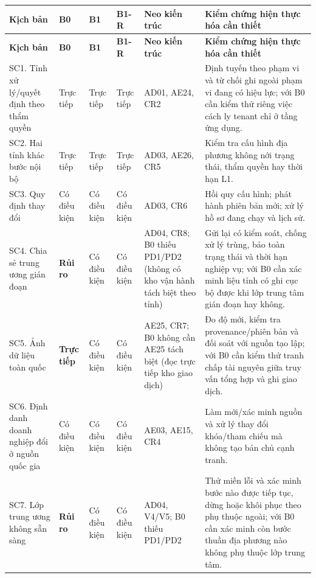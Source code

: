 \documentclass[a4paper,11pt]{article}
\begin{document}
\small
\setlength{\tabcolsep}{2.0pt}
\renewcommand{\arraystretch}{1.02}
\begin{longtable}{@{}p{2.55cm}p{1.35cm}p{1.35cm}p{1.35cm}p{2.95cm}p{4.5cm}@{}}
\toprule
\textbf{Kịch bản} & \textbf{B0} & \textbf{B1} & \textbf{B1-R} & \textbf{Neo kiến trúc} & \textbf{Kiểm chứng hiện thực hóa cần thiết} \\
\midrule
\endfirsthead
\toprule
\textbf{Kịch bản} & \textbf{B0} & \textbf{B1} & \textbf{B1-R} & \textbf{Neo kiến trúc} & \textbf{Kiểm chứng hiện thực hóa cần thiết} \\
\midrule
\endhead
\bottomrule
\endfoot
SC1. Tỉnh xử lý/quyết định theo thẩm quyền & Trực tiếp & Trực tiếp & Trực tiếp & AD01, AE24, CR2 & Định tuyến theo phạm vi và từ chối ghi ngoài phạm vi đang có hiệu lực; với B0 cần kiểm thử riêng việc cách ly tenant chỉ ở tầng ứng dụng. \\
SC2. Hai tỉnh khác bước nội bộ & Trực tiếp & Trực tiếp & Trực tiếp & AD03, AE26, CR5 & Kiểm tra cấu hình địa phương không nới trạng thái, thẩm quyền hay thời hạn L1. \\
SC3. Quy định thay đổi & Có điều kiện & Có điều kiện & Có điều kiện & AD03, CR6 & Hồi quy cấu hình; phát hành phiên bản mới; xử lý hồ sơ đang chạy và lịch sử. \\
SC4. Chia sẻ trung ương gián đoạn & \textbf{Rủi ro} & Có điều kiện & Có điều kiện & AD04, CR8; B0 thiếu PD1/PD2 (không có kho vận hành tách biệt theo tỉnh) & Gửi lại có kiểm soát, chống xử lý trùng, bảo toàn trạng thái và thời hạn nghiệp vụ; với B0 cần xác minh liệu tỉnh có ghi cục bộ được khi lớp trung tâm gián đoạn hay không. \\
SC5. Ảnh dữ liệu toàn quốc & \textbf{Trực tiếp} & Có điều kiện & Có điều kiện & AE25, CR7; B0 không cần AE25 tách biệt (đọc trực tiếp kho giao dịch) & Đo độ mới, kiểm tra provenance/phiên bản và đối soát với nguồn tạo lập; với B0 cần kiểm thử tranh chấp tài nguyên giữa truy vấn tổng hợp và ghi giao dịch. \\
SC6. Định danh doanh nghiệp đổi ở nguồn quốc gia & Có điều kiện & Có điều kiện & Có điều kiện & AE03, AE15, CR4 & Làm mới/xác minh nguồn và xử lý thay đổi khóa/tham chiếu mà không tạo bản chủ cạnh tranh. \\
SC7. Lớp trung ương không sẵn sàng & \textbf{Rủi ro} & Có điều kiện & Có điều kiện & AD04, V4/V5; B0 thiếu PD1/PD2 & Thử miền lỗi và xác minh bước nào được tiếp tục, dừng hoặc khôi phục theo phụ thuộc ngoài; với B0 cần xác minh còn bước thuần địa phương nào không phụ thuộc lớp trung tâm. \\

\end{longtable}
\end{document}
